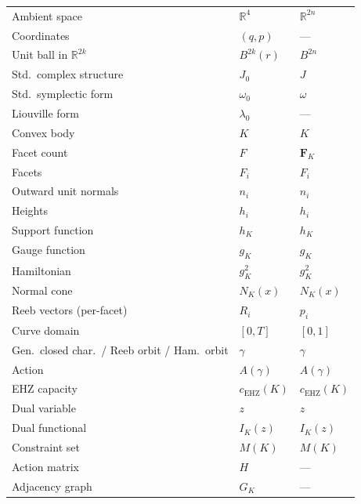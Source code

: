 \begin{longtable}{p{5.3cm} p{3.4cm} p{3.4cm}}
Ambient space                                    & $\mathbb{R}^4$      & $\mathbb{R}^{2n}$ \\
Coordinates                                      & $(q,p)$              & --- \\
Unit ball in $\mathbb{R}^{2k}$                   & $B^{2k}(r)$         & $B^{2n}$ \\
Std.\ complex structure                          & $J_0$                & $J$ \\
Std.\ symplectic form                            & $\omega_0$           & $\omega$ \\
Liouville form                                   & $\lambda_0$          & --- \\
Convex body                                      & $K$                  & $K$ \\
Facet count                                      & $F$                  & $\mathbf{F}_K$ \\
Facets                                           & $F_i$                & $F_i$ \\
Outward unit normals                             & $n_i$                & $n_i$ \\
Heights                                          & $h_i$                & $h_i$ \\
Support function                                 & $h_K$                & $h_K$ \\
Gauge function                                   & $g_K$                & $g_K$ \\
Hamiltonian                                      & $g_K^2$              & $g_K^2$ \\
Normal cone                                      & $N_K(x)$             & $N_K(x)$ \\
Reeb vectors (per-facet)                         & $R_i$                & $p_i$ \\
Curve domain                                     & $[0,T]$              & $[0,1]$ \\
Gen.\ closed char.\ / Reeb orbit / Ham.\ orbit  & $\gamma$             & $\gamma$ \\
Action                                           & $A(\gamma)$          & $A(\gamma)$ \\
EHZ capacity                                     & $c_\mathrm{EHZ}(K)$ & $c_\mathrm{EHZ}(K)$ \\
Dual variable                                    & $z$                  & $z$ \\
Dual functional                                  & $I_K(z)$             & $I_K(z)$ \\
Constraint set                                   & $M(K)$               & $M(K)$ \\
Action matrix                                    & $H$                  & --- \\
Adjacency graph                                  & $G_K$                & --- \\

\bottomrule
\end{longtable}

